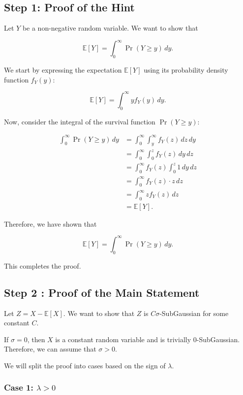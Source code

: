\documentclass[a4 paper]{article}
\theoremstyle{boldStyle}
\theoremstyle{boldBlueStyle}
\theoremstyle{boldPurpleStyle}
\theoremstyle{boldRedStyle}
\begin{document}
\bigbreak

\subsection*{Step 1: Proof of the Hint}


Let \(Y\) be a non-negative random variable. We want to show that

\[
\mathbb{E}[Y] = \int_0^\infty \Pr(Y \geq y) \, dy.
\]

We start by expressing the expectation \(\mathbb{E}[Y]\) using its probability density function \(f_Y(y)\):

\[
\mathbb{E}[Y] = \int_0^\infty y f_Y(y) \, dy.
\]

Now, consider the integral of the survival function \(\Pr(Y \geq y)\):

\begin{align*}
\int_0^\infty \Pr(Y \geq y) \, dy &= \int_0^\infty \int_y^\infty f_Y(z) \, dz \, dy \\
&= \int_0^\infty \int_0^z f_Y(z) \, dy \, dz \\
&= \int_0^\infty f_Y(z) \int_0^z 1 \, dy \, dz \\
&= \int_0^\infty f_Y(z) \cdot z \, dz \\
&= \int_0^\infty z f_Y(z) \, dz \\
&= \mathbb{E}[Y].
\end{align*}

Therefore, we have shown that

\[
\mathbb{E}[Y] = \int_0^\infty \Pr(Y \geq y) \, dy.
\]

This completes the proof.

\subsection*{Step 2 : Proof of the Main Statement}



Let \(Z = X - \mathbb{E}[X]\). We want to show that \(Z\) is \(C\sigma\)-SubGaussian for some constant \(C\). 

If $\sigma = 0$, then $X$ is a constant random variable and is trivially $0$-SubGaussian. Therefore, we can assume that $\sigma > 0$.

We will split the proof into cases based on the sign of \(\lambda\).

\subsubsection*{Case 1: \(\lambda > 0\)}
\end{document}
